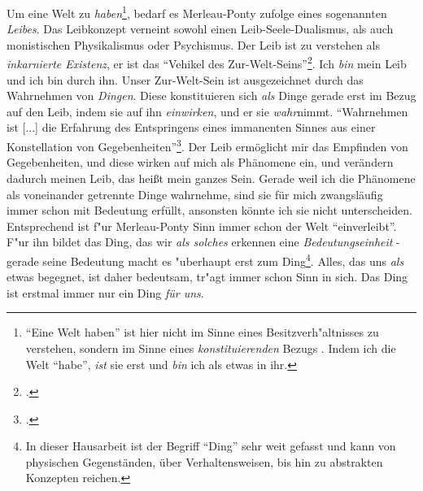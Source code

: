 \documentclass[a4paper, 12pt]{article}
\begin{document}
\begin{onehalfspace}
Um eine Welt zu \emph{haben}\footnote{"`Eine Welt haben"' ist hier nicht im Sinne eines Besitzverh"altnisses zu verstehen, sondern im Sinne eines \emph{konstituierenden} Bezugs . Indem ich die Welt "`habe"', \emph{ist} sie erst und \emph{bin} ich als etwas in ihr.}, bedarf es Merleau-Ponty zufolge eines sogenannten \emph{Leibes}. Das Leibkonzept verneint sowohl einen Leib-Seele-Dualismus, als auch monistischen Physikalismus oder Psychismus. Der Leib ist zu verstehen als \emph{inkarnierte Existenz}, er ist das "`Vehikel des Zur-Welt-Seins"'\footnote{\Cite[Siehe][S. 106]{merleau1966phanomenologie}.}. Ich \emph{bin} mein Leib und ich bin durch ihn. Unser Zur-Welt-Sein ist ausgezeichnet durch das Wahrnehmen von \emph{Dingen}. Diese konstituieren sich \emph{als} Dinge gerade erst im Bezug auf den Leib, indem sie auf ihn \emph{einwirken}, und er sie \emph{wahr}nimmt. "`Wahrnehmen ist [...] die Erfahrung des Entspringens eines immanenten Sinnes aus einer Konstellation von Gegebenheiten"'\footnote{\citep[S. 42]{merleau1966phanomenologie}.}. Der Leib ermöglicht mir das Empfinden von Gegebenheiten, und diese wirken auf mich als Phänomene ein, und verändern dadurch meinen Leib, das heißt mein ganzes Sein. Gerade weil ich die Phänomene als voneinander getrennte Dinge wahrnehme, sind sie für mich zwangsläufig immer schon mit Bedeutung erfüllt, ansonsten könnte ich sie nicht unterscheiden. Entsprechend ist f"ur Merleau-Ponty Sinn immer schon der Welt "`einverleibt"'. F"ur ihn bildet das Ding, das wir \emph{als solches} erkennen eine \emph{Bedeutungseinheit} - gerade seine Bedeutung macht es "uberhaupt erst zum Ding\footnote{In dieser Hausarbeit ist der Begriff "`Ding"' sehr weit gefasst und kann von physischen Gegenständen, über Verhaltensweisen, bis hin zu abstrakten Konzepten reichen.}. Alles, das uns \emph{als} etwas begegnet, ist daher bedeutsam, tr"agt immer schon Sinn in sich. Das Ding ist erstmal immer nur ein Ding \emph{für uns}.


\end{onehalfspace}
\end{document}
